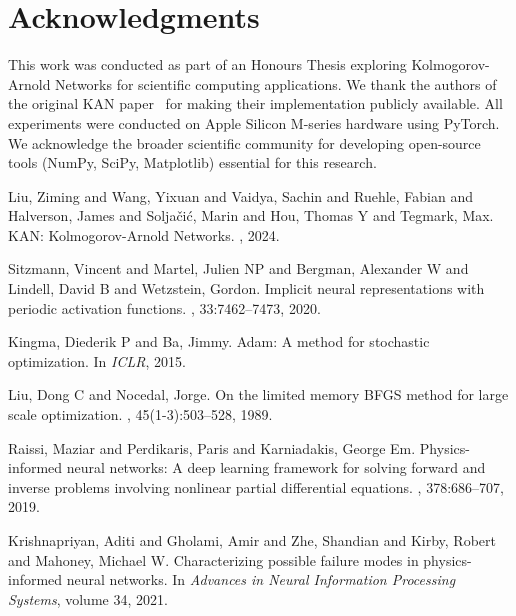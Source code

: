 \documentclass[11pt,a4paper]{article}
\begin{document}
\section*{Acknowledgments}

This work was conducted as part of an Honours Thesis exploring Kolmogorov-Arnold Networks for scientific computing applications. We thank the authors of the original KAN paper~\citep{liu2024kan} for making their implementation publicly available. All experiments were conducted on Apple Silicon M-series hardware using PyTorch. We acknowledge the broader scientific community for developing open-source tools (NumPy, SciPy, Matplotlib) essential for this research.




\begin{thebibliography}{15}

Liu, Ziming and Wang, Yixuan and Vaidya, Sachin and Ruehle, Fabian and Halverson, James and Soljačić, Marin and Hou, Thomas Y and Tegmark, Max.
\newblock KAN: Kolmogorov-Arnold Networks.
, 2024.

Sitzmann, Vincent and Martel, Julien NP and Bergman, Alexander W and Lindell, David B and Wetzstein, Gordon.
\newblock Implicit neural representations with periodic activation functions.
, 33:7462--7473, 2020.

Kingma, Diederik P and Ba, Jimmy.
\newblock Adam: A method for stochastic optimization.
\newblock In {\em ICLR}, 2015.

Liu, Dong C and Nocedal, Jorge.
\newblock On the limited memory BFGS method for large scale optimization.
, 45(1-3):503--528, 1989.

Raissi, Maziar and Perdikaris, Paris and Karniadakis, George Em.
\newblock Physics-informed neural networks: A deep learning framework for solving forward and inverse problems involving nonlinear partial differential equations.
, 378:686--707, 2019.

Krishnapriyan, Aditi and Gholami, Amir and Zhe, Shandian and Kirby, Robert and Mahoney, Michael W.
\newblock Characterizing possible failure modes in physics-informed neural networks.
\newblock In {\em Advances in Neural Information Processing Systems}, volume 34, 2021.


\end{thebibliography}
\end{document}
